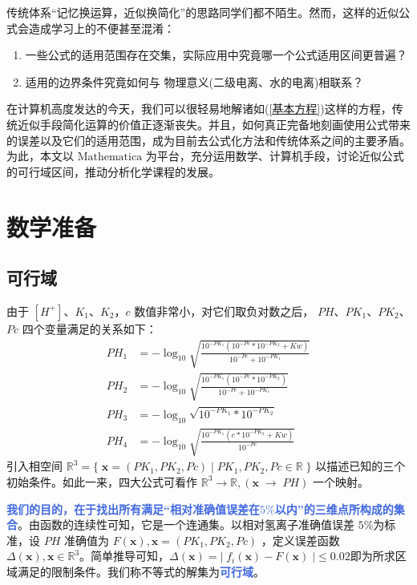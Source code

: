 \documentclass[UTF-8]{ctexart}
\newcommand{\R}{\mathbb{R}}
\newcommand{\0}{\boldsymbol{0}}
\begin{document}
  传统体系“记忆换运算，近似换简化”的思路同学们都不陌生。然而，这样的近似公式会造成学习上的不便甚至混淆：
  {\fontsize{10pt}{16pt} \begin{enumerate}
      \item 一些公式的适用范围存在交集，实际应用中究竟哪一个公式适用区间更普遍？
      \item 适用的边界条件究竟如何与 物理意义(二级电离、水的电离)相联系？
  \end{enumerate}}

  在计算机高度发达的今天，我们可以很轻易地解诸如(\ref{基本方程})这样的方程，传统近似手段简化运算的价值正逐渐丧失。并且，如何真正完备地刻画使用公式带来的误差以及它们的适用范围，成为目前去公式化方法和传统体系之间的主要矛盾。为此，本文以 $\text{Mathematica}$ 为平台，充分运用数学、计算机手段，讨论近似公式的可行域区间，推动分析化学课程的发展。
  
\section{数学准备}
\subsection{可行域}
由于 $[H^+]$、$K_1$、$K_2$，$c$ 数值非常小，对它们取负对数之后， $PH$、$PK_1$、$PK_2$、$Pc$ 四个变量满足的关系如下：
\begin{align*}     
    PH_1&=-\log_{10} \sqrt{     \frac{10^{-PK_1}(10^{-Pc} *10^{-PK_2}+Kw)}  {10^{-Pc}+10^{-PK_1}} }\\  PH_2&= -\log_{10} \sqrt{     \frac{10^{-PK_1}(10^{-Pc} *10^{-PK_2})}  {10^{-Pc}+10^{-PK_1}} }\\      PH_3&=-\log_{10} \sqrt{     10^{-PK_1}*10^{-PK_2} }\\   PH_4&=-\log_{10} \sqrt{     \frac{10^{-PK_1}(c *10^{-PK_2}+Kw)}  {10^{-Pc}} } 
\end{align*}
引入相空间 $\R^3=\{\;\bm{x}= (PK_1,PK_2,Pc)\;|\;PK_1,PK_2,Pc\in \R\;\}$ 以描述已知的三个初始条件。如此一来，四大公式可看作 $\R^3\rightarrow  \R,(\bm{x}\;\rightarrow \;PH)$ 一个映射。

\textcolor{RoyalBlue}{\textbf{我们的目的，在于找出所有满足“相对准确值误差在$5\%$以内”的三维点所构成的集合}}。由函数的连续性可知，它是一个连通集。以相对氢离子准确值误差 $5\% $为标准，设 $PH$ 准确值为 $F(\bm{x}),\bm{x} = (PK_1,PK_2,Pc)$ ，定义误差函数 $\Delta (\bm{x}),\bm{x}\in \R^3 $。简单推导可知，$ \Delta(\bm{x})=|\;f_i(\bm{x})-F(\bm{x})\;|\leq0.02 $即为所求区域满足的限制条件。我们称不等式的解集为\textcolor{RoyalBlue}{\textbf{可行域}}。
\end{document}
